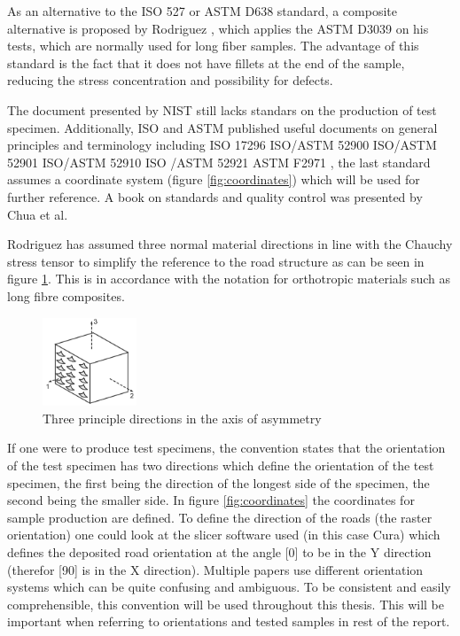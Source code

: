 As an alternative to the ISO 527 or ASTM D638 standard, a composite alternative is proposed by Rodriguez \cite{Rodriguez2001MechanicalInvestigation}, which applies the ASTM D3039 on his tests, which are normally used for long fiber samples. The advantage of this standard is the fact that it does not have fillets at the end of the sample, reducing the stress concentration and possibility for defects.

The document presented by NIST \cite{T.Bauer2015NIST:} still lacks standars on the production of test specimen. Additionally, ISO and ASTM published useful documents on general principles and terminology including ISO 17296  \cite{Nen-iso2019NEN-EN-ISOTestmethoden} ISO/ASTM 52900 \cite{ASTMInternational2017ISOParts} ISO/ASTM 52901 \cite{2019NEN-EN-ISOParts} ISO/ASTM 52910  \cite{ASTMInternational2018ISORecommendations} ISO /ASTM 52921 \cite{Nen-iso2019NEN-EN-ISOTestmethoden} ASTM F2971 \cite{2013ASTMManufacturing}, the last standard assumes a coordinate system (figure \ref{fig:coordinates}) which will be used for further reference. A book on standards and quality control was presented by Chua et al. \cite{ChuaStandardManufacturing}

Rodriguez \cite{Rodriguez2003MechanicalModeling} has assumed three normal material directions in line with the Chauchy stress tensor to simplify the reference to the road structure as can be seen in figure \ref{fig:Principlematerial}. This is in accordance with the notation for orthotropic materials such as long fibre composites.
\begin{figure}[H]
    \centering
    \includegraphics[width=0.25\textwidth]{chapter_2/figures/Principlematerial.PNG}
    \caption{Three principle directions in the axis of asymmetry}
    \label{fig:Principlematerial}
\end{figure}

If one were to produce test specimens, the convention states that the orientation of the test specimen has two directions which define the orientation of the test specimen, the first being the direction of the longest side of the specimen, the second being the smaller side. In figure \ref{fig:coordinates} the coordinates for sample production are defined. 
To define the direction of the roads (the raster orientation) one could look at the slicer software used (in this case Cura) which defines the deposited road orientation at the angle [0] to be in the Y direction (therefor [90] is in the X direction). Multiple papers use different orientation systems which can be quite confusing and ambiguous. To be consistent and easily comprehensible, this convention will be used throughout this thesis. This will be important when referring to orientations and tested samples in rest of the report. 


